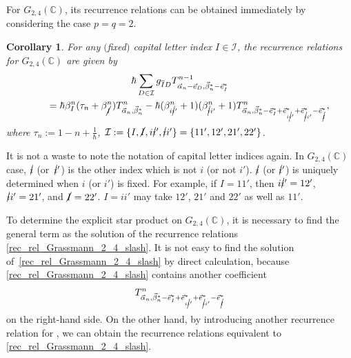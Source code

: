 \documentclass[pdftex]{sigma}
\numberwithin{equation}{section}
\newtheorem{Corollary}[Theorem]{Corollary}
\begin{document}
For $G_{2,4}(\mathbb{C})$, its recurrence relations can be obtained immediately by considering the case $p=q=2$.
\begin{Corollary}\label{theorem_rec_rel_Grassmann_2_4}
For any $($fixed$)$ capital letter index $I\in\mathcal{I}$, the recurrence relations for
$
 G_{2,4}(\mathbb{C})
$
are given by
\begin{gather}
 \hbar
 \sum_{
 D
 \in
 \mathcal{I}
 }
 g_{\overline{I}D}
 T^{n-1}_{\vec{\alpha}_{n}-\vec{e}_{D},\vec{\beta}_{n}^{\ast}-\vec{e}_{I}^{\ast}}\nonumber\\
 \qquad
 =
 \hbar
 \beta_{I}^{n}
 (
 \tau_{n}
 +
 \beta_{\cancel{I}}^{n}
 )
 T^{n}_{\vec{\alpha}_{n},\vec{\beta}_{n}^{\ast}}
 -
 \hbar
 (
 \beta_{i\cancel{i}'}^{n}
 +
 1
 )
 (
 \beta_{\cancel{i}i'}^{n}
 +
 1
 )
 T^{n}_{\vec{\alpha}_{n},\vec{\beta}_{n}^{\ast}-\vec{e}_{I}^{\ast}+\vec{e}_{i\cancel{i}'}^{\ast}+\vec{e}_{\cancel{i}i'}^{\ast} -\vec{e}_{\cancel{I}}^{\ast}},
 \label{rec_rel_Grassmann_2_4_slash}
\end{gather}
where
$
 \tau_{n}
 :=
 1
 -
 n
 +
 \frac{1}{\hbar}
$,
$
\mathcal{I}
:=
\{
I,
\cancel{I},
i\cancel{i}',
\cancel{i}i'
\}
=
\{
11',
12',
21',
22'
\}
$.
\end{Corollary}

It is not a waste to note the notation of capital letter indices again. In $G_{2,4}(\mathbb{C})$ case, $\cancel{i}$ (or~$\cancel{i}'$) is the other index which is not $i$ (or not $i'$). $\cancel{i}$ (or $\cancel{i}'$) is uniquely determined when $i$ (or $i'$) is fixed. For example, if $I=11'$, then $i\cancel{i}'=12'$, $\cancel{i}i'=21'$, and $\cancel{I}=22'$. $I=ii'$ may take $12'$, $21'$ and $22'$ as well as $11'$.

To determine the explicit star product on $G_{2,4}(\mathbb{C})$, it is necessary to find the general term  as the solution of the recurrence relations \eqref{rec_rel_Grassmann_2_4_slash}. It is not easy to find the solution  of~\eqref{rec_rel_Grassmann_2_4_slash} by direct calculation, because \eqref{rec_rel_Grassmann_2_4_slash} contains another coefficient
\[
T^{n}_{\vec{\alpha}_{n},\vec{\beta}_{n}^{\ast}-\vec{e}_{I}^{\ast}
+\vec{e}_{i\cancel{i}'}^{\ast}+\vec{e}_{\cancel{i}i'}^{\ast}-\vec{e}_{\cancel{I}}^{\ast}}
\]
 on the right-hand side. On the other hand, by introducing another recurrence relation for , we can obtain the recurrence relations equivalent to \eqref{rec_rel_Grassmann_2_4_slash}.
\end{document}

